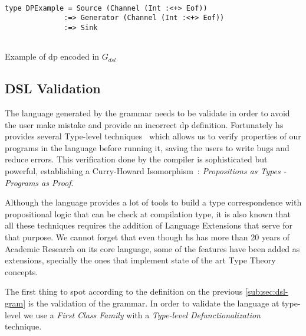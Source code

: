 \begin{listing}[H]
  \begin{verbatim}

type DPExample = Source (Channel (Int :<+> Eof)) 
              :=> Generator (Channel (Int :<+> Eof)) 
              :=> Sink
   
  \end{verbatim}
  \caption{Example of \acrshort{dp} encoded in $G_{dsl}$}
  \label{src:dpfh:3}
\end{listing}

\subsection{DSL Validation}\label{sub:sec:dsl-val}
The language generated by the grammar needs to be validate in order to avoid the user make mistake and provide an incorrect \acrshort{dp} definition.
Fortunately \acrshort{hs} provides several Type-level techniques~\cite{type-haskell} which allows us to verify properties of our programs in the language before running it, 
saving the users to write bugs and reduce errors. This verification done by the compiler is sophisticated but powerful, establishing a Curry-Howard Isomorphism~\cite{curryhoward}: 
\emph{Propositions as Types - Programs as Proof}. 

Although the language provides a lot of tools to build a type correspondence with propositional logic that can be check at compilation type, it is also known that all these
techniques requires the addition of Language Extensions that serve for that purpose. We cannot forget that even though \acrshort{hs} has more than 20 years of 
Academic Research on its core language, some of the features have been added as extensions, specially the ones that implement state of the art Type Theory concepts. 

The first thing to spot according to the definition on the previous \autoref{sub:sec:dsl-gram} is the validation of the grammar. 
In order to validate the language at type-level we use a \emph{First Class Family} with a \emph{Type-level Defunctionalization}~\cite{fun-type-function-haskell} technique.


